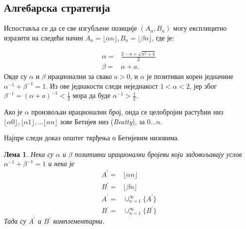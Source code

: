 \documentclass[a4paper]{article}
\newtheorem{lemma}{Лема}
\begin{document}
\subsection{Алгебарска стратегија}

Испоставља се да се све изгубљене позиције $ (A_{n}, B_{n}) $ могу експлицитно изразити на следећи начин $ A_{n} = \lfloor \alpha n \rfloor, B_{n} = \lfloor \beta n \rfloor $, где је:

\begin{eqnarray}
	&\alpha = &\frac{2 - a + \sqrt{a^2 + 4}}{2} \label{def:alpha}\\  
	&\beta = &\alpha + a \label{def:beta}.
\end{eqnarray}
Овде су $ \alpha $ и $ \beta $ ирационални за свако $ a > 0 $, и $ \alpha $ је позитиван корен једначине $ \alpha^{-1} + \beta^{-1} = 1 $. Из ове једнакости следи неједнакост
$ 1<\alpha<2 $, јер због $ \beta^{-1} = (\alpha+a)^{-1} < \frac{1}{2 }$ мора да буде $ \alpha^{-1} > \frac{1}{2} $.

Ако је $ \alpha $ произвољан ирационални број, онда се целобројни растућии низ $ \lfloor \alpha 0 \rfloor, \lfloor \alpha 1 \rfloor, \ldots \lfloor \alpha n \rfloor $ зове Бетијев низ (\textit{{Beatty}}), за $ 0 \ldots n $.

Најпре следи доказ општег тврђења о Бетијевим низовима.

\begin{lemma}
	\label{lemma:alg_komplementarnost}
	Нека су $ \alpha $ и $ \beta $ позитивни ирационални бројеви који задовољавају услов $ \alpha^{-1} + \beta^{-1} = 1 $ и нека је 
	\begin{eqnarray*} 
		&A^{'} = &\lfloor \alpha n \rfloor\\
		&B^{'} = &\lfloor \beta n \rfloor\\
		&A^{'} = &\cup_{n=1}^{\infty}\{A^{'}\}\\
		&B^{'} = &\cup_{n=1}^{\infty}\{B^{'}\}
	\end{eqnarray*}
	Тада су $ A^{'} $ и $ B^{'} $ комплементарни.
\end{lemma}
\end{document}
